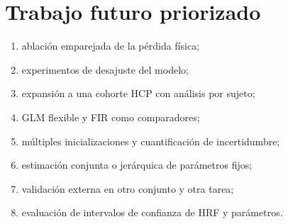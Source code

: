 \section{Trabajo futuro priorizado}
\begin{enumerate}
  \item ablación emparejada de la pérdida física;
  \item experimentos de desajuste del modelo;
  \item expansión a una cohorte HCP con análisis por sujeto;
  \item GLM flexible y FIR como comparadores;
  \item múltiples inicializaciones y cuantificación de incertidumbre;
  \item estimación conjunta o jerárquica de parámetros fijos;
  \item validación externa en otro conjunto y otra tarea;
  \item evaluación de intervalos de confianza de HRF y parámetros.
\end{enumerate}
